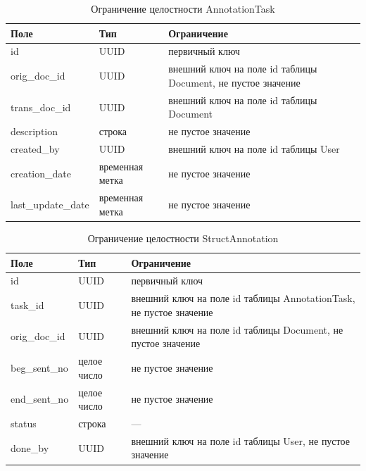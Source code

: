 \begin{table}[H]
\centering
\caption{Ограничение целостности AnnotationTask}
\begin{tabular}{|m{4cm}|m{3cm}|m{6cm}|}
\hline
\textbf{Поле} & \textbf{Тип} & \textbf{Ограничение} \\ \hline
id & UUID & первичный ключ \\ \hline
orig\_doc\_id & UUID & внешний ключ на поле id таблицы Document, не пустое значение \\ \hline
trans\_doc\_id & UUID & внешний ключ на поле id таблицы Document \\ \hline
description & строка & не пустое значение \\ \hline
created\_by & UUID & внешний ключ на поле id таблицы User \\ \hline
creation\_date & временная метка & не пустое значение \\ \hline
last\_update\_date & временная метка & не пустое значение \\ \hline
\end{tabular}
\label{tab:annottask}
\end{table}

\begin{table}[H]
\centering
\caption{Ограничение целостности StructAnnotation}
\begin{tabular}{|m{3cm}|m{3cm}|m{6cm}|}
\hline
\textbf{Поле} & \textbf{Тип} & \textbf{Ограничение} \\ \hline
id & UUID & первичный ключ \\ \hline
task\_id & UUID & внешний ключ на поле id таблицы AnnotationTask, не пустое значение \\ \hline
orig\_doc\_id & UUID & внешний ключ на поле id таблицы Document, не пустое значение \\ \hline
beg\_sent\_no & целое число & не пустое значение \\ \hline
end\_sent\_no & целое число & не пустое значение \\ \hline
status & строка & --- \\ \hline
done\_by & UUID & внешний ключ на поле id таблицы User, не пустое значение \\ \hline
\end{tabular}
\label{tab:structannot}
\end{table}


